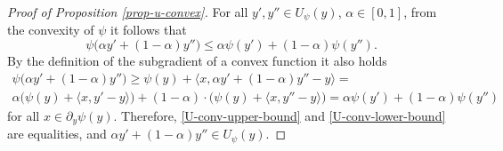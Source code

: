 \documentclass{article} %
\begin{document}
\begin{proof}[Proof of Proposition \ref{prop-u-convex}]For all $y',y''\in U_{\psi}(y)$, $\alpha\in[0,1]$, from the convexity of $\psi$ it follows that
\begin{equation}
    \psi\big(\alpha y'+(1-\alpha)y''\big)\leq \alpha \psi(y')+(1-\alpha)\psi(y'').
    \label{U-conv-upper-bound}
\end{equation}
By the definition of the subgradient of a convex function it also holds
\begin{eqnarray}\psi\big(\alpha y'+(1-\alpha)y''\big)\geq\psi(y)+\langle x,\alpha y'+(1-\alpha)y''-y\rangle=
\nonumber
\\
    \alpha\big(\psi(y)+\langle x, y'-y\rangle\big)+(1-\alpha)\cdot\big(\psi(y)+\langle x, y''-y\rangle\big)=\alpha \psi(y')+(1-\alpha)\psi(y'')
    \label{U-conv-lower-bound}
\end{eqnarray}
for all $x\in\partial_{y}\psi(y).$ Therefore, \eqref{U-conv-upper-bound} and \eqref{U-conv-lower-bound} are equalities, and $\alpha y'+(1-\alpha)y''\in U_{\psi}(y)$.
\end{proof}
\end{document}
